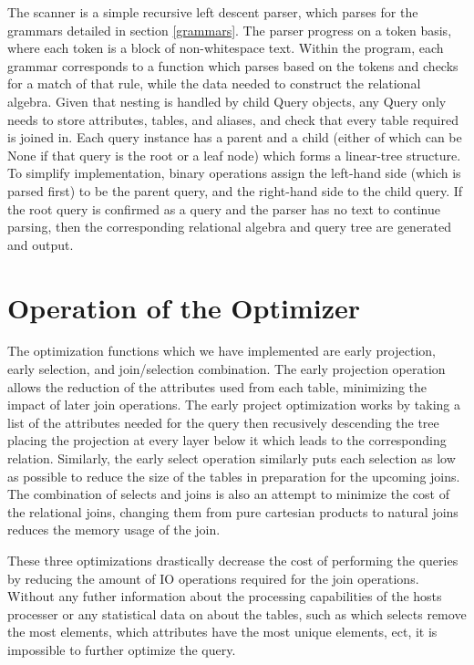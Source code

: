 \documentclass[]{article}
\begin{document}
	The scanner is a simple recursive left descent parser, which parses for the grammars detailed in section \ref{grammars}. The parser progress on a token basis, where each token is a block of non-whitespace text. Within the program, each grammar corresponds to a function which parses based on the tokens and checks for a match of that rule, while the data needed to construct the relational algebra. Given that nesting is handled by child Query objects, any Query only needs to store attributes, tables, and aliases, and check that every table required is joined in. Each query instance has a parent and a child (either of which can be None if that query is the root or a leaf node) which forms a linear-tree structure. To simplify implementation, binary operations assign the left-hand side (which is parsed first) to be the parent query, and the right-hand side to the child query.
	If the root query is confirmed as a query and the parser has no text to continue parsing, then the corresponding relational algebra and query tree are generated and output.

	\section{Operation of the Optimizer}

	The optimization functions which we have implemented are early projection, early selection, and join/selection combination. The early projection operation allows the reduction of the attributes used from each table, minimizing the impact of later join operations. The early project optimization works by taking a list of the attributes needed for the query then recusively descending the tree placing the projection at every layer below it which leads to the corresponding relation. Similarly, the early select operation similarly puts each selection as low as possible to reduce the size of the tables in preparation for the upcoming joins. The combination of selects and joins is also an attempt to minimize the cost of the relational joins, changing them from pure cartesian products to natural joins reduces the memory usage of the join.

	These three optimizations drastically decrease the cost of performing the queries by reducing the amount of IO operations required for the join operations. Without any futher information about the processing capabilities of the hosts processer or any statistical data on about the tables, such as which selects remove the most elements, which attributes have the most unique elements, ect, it is impossible to further optimize the query.    
	
\end{document}
